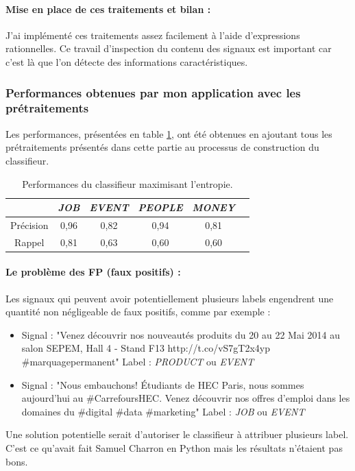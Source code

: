                 \paragraph{Mise en place de ces traitements et bilan :}
                    J'ai implémenté ces traitements assez facilement à l'aide d'expressions rationnelles. Ce travail d'inspection du contenu des signaux est important car c'est là que l'on détecte des informations caractéristiques.

            \subsubsection{Performances obtenues par mon application avec les prétraitements}
                Les performances, présentées en table \ref{tab:classif_perf4}, ont été obtenues en ajoutant tous les prétraitements présentés dans cette partie au processus de construction du classifieur.
                \begin{table}[t]
                    \centering
                    \begin{tabular}{| c | c | c | c | c | c |}
                        \hline
                         & \textit{JOB} & \textit{EVENT} & \textit{PEOPLE} & \textit{MONEY} \\
                        \hline
                        Précision & 0,96 & 0,82 & 0,94 & 0,81 \\
                        Rappel & 0,81 & 0,63 & 0,60 & 0,60 \\
                        \hline
                    \end{tabular}
                    \caption{Performances du classifieur maximisant l'entropie.}
                    \label{tab:classif_perf4}
                \end{table}


                \paragraph{Le problème des FP (faux positifs) :}
                    Les signaux qui peuvent avoir potentiellement plusieurs labels engendrent une quantité non négligeable de faux positifs, comme par exemple :
                    \begin{itemize}
                        \item Signal : "Venez découvrir nos nouveautés produits du 20 au 22 Mai 2014 au salon SEPEM, Hall 4 - Stand F13 http://t.co/vS7gT2x4yp \#marquagepermanent" Label : \textit{PRODUCT} ou \textit{EVENT}
                        \item Signal : "Nous embauchons! Étudiants de HEC Paris, nous sommes aujourd'hui au \#CarrefoursHEC. Venez découvrir nos offres d'emploi dans les domaines du \#digital \#data \#marketing" Label : \textit{JOB} ou \textit{EVENT}
                    \end{itemize}
                    Une solution potentielle serait d'autoriser le classifieur à attribuer plusieurs label. C'est ce qu'avait fait Samuel Charron en Python mais les résultats n'étaient pas bons.

